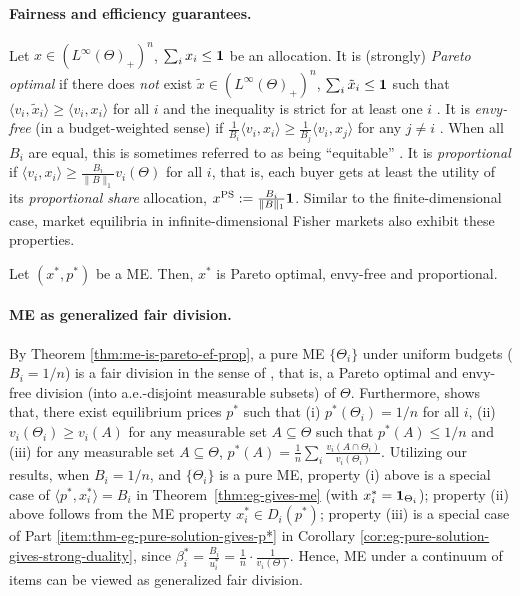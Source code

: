 \paragraph{Fairness and efficiency guarantees.} 
Let $x\in (L^\infty(\Theta)_+)^n$, $\sum_i x_i \leq \mathbf{1}$ be an allocation. It is (strongly) \emph{Pareto optimal} if there does \emph{not} exist $\tilde{x}\in (L^\infty(\Theta)_+)^n$, $\sum_i \tilde{x}_i \leq \mathbf{1}$ such that $\langle v_i, \tilde{x}_i \rangle \geq \langle v_i, x_i \rangle$ for all $i$ and the inequality is strict for at least one $i$ \citep{cohler2011optimal}. 
It is \emph{envy-free} (in a budget-weighted sense) if 
$\frac{1}{B_i}\langle v_i, x_i \rangle \geq \frac{1}{B_j}\langle v_i, x_j\rangle$
for any $j\neq i$ \citep{nisan2007algorithmic,kroer2019computing}. 
When all $B_i$ are equal, this is sometimes referred to as being ``equitable'' \citep{weller1985fair}. 
It is \emph{proportional} if $\langle v_i, x_i \rangle \geq \frac{B_i}{\|B\|_1} v_i(\Theta)$ for all $i$, that is, each buyer gets at least the utility of its \emph{proportional share} allocation, 
$x^{\rm PS} := \frac{B_i}{\|B\|_1} \mathbf{1}$. 
Similar to the finite-dimensional case, market equilibria in infinite-dimensional Fisher markets also exhibit these properties.
\begin{theorem}
	Let $(x^*, p^*)$ be a ME. Then, $x^*$ is Pareto optimal, envy-free and proportional. \label{thm:me-is-pareto-ef-prop}
\end{theorem}

\paragraph{ME as generalized fair division.}
By Theorem \ref{thm:me-is-pareto-ef-prop}, a pure ME $\{\Theta_i\}$ under uniform budgets ($B_i = 1/n$) is a fair division in the sense of \citet{weller1985fair}, that is, a Pareto optimal and envy-free division (into a.e.-disjoint measurable subsets) of $\Theta$. 
Furthermore, \citep[\S 3]{weller1985fair} shows that, there exist equilibrium prices $p^*$ such that 
(i) $p^*(\Theta_i) = 1/n$ for all $i$, 
(ii) $v_i(\Theta_i) \geq v_i(A)$ for any measurable set $A \subseteq \Theta$ such that $p^*(A) \leq 1/n$ and
(iii) for any measurable set $A\subseteq \Theta$, $p^*(A) = \frac{1}{n}\sum_i \frac{v_i(A\cap \Theta_i)}{v_i(\Theta_i)}$.
Utilizing our results, when $B_i = 1/n$, and $\{\Theta_i\}$ is a pure ME, property (i) above is a special case of $\langle p^*, x^*_i \rangle = B_i$ in Theorem~\ref{thm:eg-gives-me} (with $x^*_i = \mathbf{1}_{\Theta_i}$); property (ii) above follows from the ME property $x^*_i \in D_i(p^*)$; property (iii) is a special case of Part \ref{item:thm-eg-pure-solution-gives-p*} in Corollary \ref{cor:eg-pure-solution-gives-strong-duality}, since $\beta^*_i = \frac{B_i}{u^*_i} = \frac{1}{n} \cdot \frac{1}{v_i(\Theta)}$. Hence, ME under a continuum of items can be viewed as generalized fair division.

